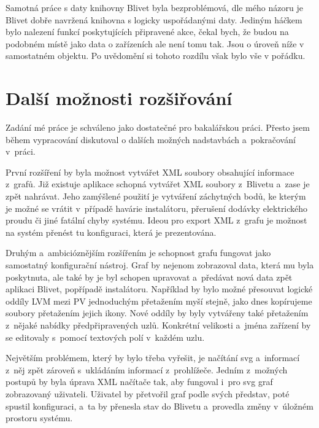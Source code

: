 \documentclass[color,table,oneside,nolot,nolof]{fithesis}
\begin{document}
	Samotná práce s daty knihovny Blivet byla bezproblémová, dle mého názoru je Blivet dobře navržená knihovna s logicky uspořádanými daty. Jediným háčkem bylo nalezení funkcí poskytujících
	připravené akce, čekal bych, že budou na podobném místě jako data o zařízeních ale není tomu tak. Jsou o úroveň níže v samostatném objektu. Po uvědomění si tohoto rozdílu však bylo vše
	v pořádku.
  
\section{Další možnosti rozšiřování}
	Zadání mé práce je schváleno jako dostatečné pro bakalářskou práci. Přesto jsem během vypracování diskutoval o dalších možných nadstavbách a~pokračování v~práci.

	První rozšíření by byla možnost vytvářet XML soubory obsahující informace z~grafů. Již existuje aplikace schopná vytvářet XML soubory z~Blivetu a~zase je zpět nahrávat. Jeho zamýšlené
	použití je vytváření záchytných bodů, ke kterým je možné se vrátit v~případě havárie instalátoru, přerušení dodávky elektrického proudu či jiné fatální chyby systému. Ideou pro export
	XML z~grafu je možnost na systém přenést tu konfiguraci, která je prezentována.

	Druhým a~ambicióznějším rozšířením je schopnost grafu fungovat jako samostatný konfigurační nástroj. Graf by nejenom zobrazoval data, která mu byla poskytnuta, ale také by je byl
	schopen upravovat a~předávat nová data zpět aplikaci Blivet, popřípadě instalátoru. Například by bylo možné přesouvat logické oddíly LVM mezi PV jednoduchým 
	přetažením myší stejně, jako dnes kopírujeme soubory přetažením jejich ikony. Nové oddíly by byly vytvářeny také přetažením z~nějaké nabídky předpřipravených uzlů. Konkrétní velikosti
	a~jména zařízení by se editovaly s~pomocí textových polí v~každém uzlu.
	
	Největším problémem, který by bylo třeba vyřešit, je načítání svg a~informací z~něj zpět zároveň s~ukládáním informací z~prohlížeče. 
	Jedním z~možných postupů by byla úprava XML načítače tak, aby fungoval i~pro svg graf zobrazovaný uživateli. Uživatel by přetvořil graf podle svých představ, poté spustil 
	konfiguraci, a~ta by přenesla stav do Blivetu a~provedla změny v~úložném prostoru systému. 

	\printbibliography
\end{document}
